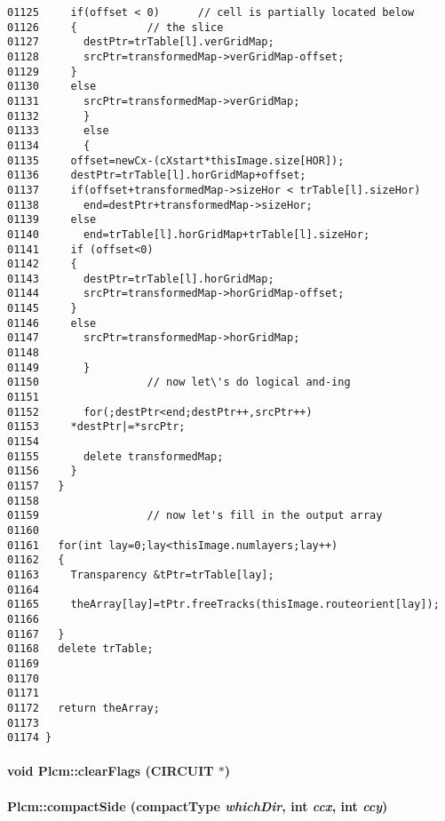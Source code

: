 \begin{verbatim}
01125     if(offset < 0)      // cell is partially located below 
01126     {           // the slice
01127       destPtr=trTable[l].verGridMap;
01128       srcPtr=transformedMap->verGridMap-offset;
01129     }
01130     else
01131       srcPtr=transformedMap->verGridMap;
01132       }
01133       else
01134       {
01135     offset=newCx-(cXstart*thisImage.size[HOR]); 
01136     destPtr=trTable[l].horGridMap+offset;
01137     if(offset+transformedMap->sizeHor < trTable[l].sizeHor)
01138       end=destPtr+transformedMap->sizeHor;
01139     else
01140       end=trTable[l].horGridMap+trTable[l].sizeHor;
01141     if (offset<0)
01142     {
01143       destPtr=trTable[l].horGridMap;
01144       srcPtr=transformedMap->horGridMap-offset;
01145     }
01146     else
01147       srcPtr=transformedMap->horGridMap;
01148     
01149       }
01150                 // now let\'s do logical and-ing
01151 
01152       for(;destPtr<end;destPtr++,srcPtr++)
01153     *destPtr|=*srcPtr;
01154 
01155       delete transformedMap;
01156     }
01157   }
01158 
01159                 // now let's fill in the output array
01160 
01161   for(int lay=0;lay<thisImage.numlayers;lay++)
01162   {
01163     Transparency &tPtr=trTable[lay];
01164 
01165     theArray[lay]=tPtr.freeTracks(thisImage.routeorient[lay]);
01166 
01167   }
01168   delete trTable;
01169 
01170 
01171 
01172   return theArray;
01173 
01174 }
\end{verbatim}\normalsize 
\label{Plcm_c1}
\paragraph{\setlength{\rightskip}{0pt plus 5cm}void Plcm::clear\-Flags (CIRCUIT $\ast$)\hspace{0.3cm}{\tt  [private]}}\hfill

\label{Plcm_c16}
\paragraph{ Plcm::compact\-Side ({\bf compact\-Type} {\em which\-Dir}, int {\em ccx}, int {\em ccy})\hspace{0.3cm}{\tt  [private]}}\hfill



